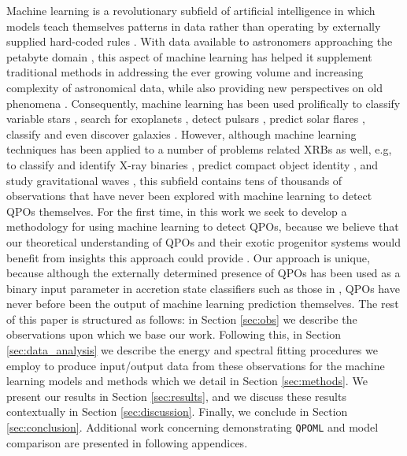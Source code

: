 \documentclass[fleqn,usenatbib,twocolumn]{mnras}%
\begin{document}
Machine learning is a revolutionary subfield of artificial intelligence in which models teach themselves patterns in data rather than operating by externally supplied hard-coded rules \citep{goodfellow2016deep}. With data available to astronomers approaching the petabyte domain \citep{2014MLinAstro}, this aspect of machine learning has helped it supplement traditional methods in addressing the ever growing volume and increasing complexity of astronomical data, while also providing new perspectives on old phenomena \citep{bigUNIbigDATA,astroMLarticlenotPython}. Consequently, machine learning has been used prolifically to classify variable stars \citep{mlVariableStars2011}, search for exoplanets \citep{mlExos}, detect pulsars \citep{detectPulsars}, predict solar flares \citep{solarflareML}, classify and even discover galaxies \citep{classifyGalaxies,discoverGalaxies}. However, although machine learning techniques has been applied to a number of problems related XRBs as well, e.g, to classify and identify X-ray binaries \citep{grsML2017,arnason2020,Sreehari2021,deBeurs2022,grsML2022,yang2022}, predict compact object identity \citep{Pattnaik2021}, and study gravitational waves \citep{MLgravWave}, this subfield contains tens of thousands of observations that have never been explored with machine learning to detect QPOs themselves. For the first time, in this work we seek to develop a methodology for using machine learning to detect QPOs, because we believe that our theoretical understanding of QPOs and their exotic progenitor systems would benefit from insights this approach could provide \citep{mlandtheory}. Our approach is unique, because although the externally determined presence of QPOs has been used as a binary input parameter in accretion state classifiers such as those in \cite{Sreehari2021}, QPOs have never before been the output of machine learning prediction themselves. The rest of this paper is structured as follows: in Section \ref{sec:obs} we describe the observations upon which we base our work. Following this, in Section \ref{sec:data_analysis} we describe the energy and spectral fitting procedures we employ to produce input/output data from these observations for the machine learning models and methods which we detail in Section \ref{sec:methods}. We present our results in Section \ref{sec:results}, and we discuss these results contextually in Section \ref{sec:discussion}. Finally, we conclude in Section \ref{sec:conclusion}. Additional work concerning demonstrating \texttt{QPOML} and model comparison are presented in following appendices. 
\end{document}
